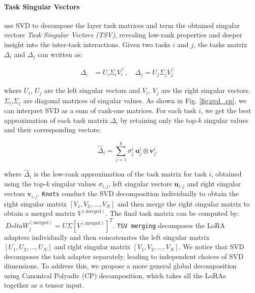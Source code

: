 \documentclass[10pt]{article} %
\begin{document}
    \paragraph{Task Singular Vectors}
    \citep{gargiulo2025task} use SVD to decompose the layer task matrices and
    term the obtained singular vectors \textit{Task Singular Vectors (TSV)},
    revealing low-rank properties and deeper insight into the inter-task
    interactions. Given two tasks $i$ and $j$, the tasks matrix $\Delta_{i}$ and
    $\Delta_{j}$ can written as:

    \begin{align}
        \Delta_{i} & = U_{i}\Sigma_{i}V_{i}^{\top}, \quad \Delta_{j}= U_{j}\Sigma_{j}V_{j}^{\top}
    \end{align}

    where $U_{i}$, $U_{j}$ are the left singular vectors and $V_{i}$, $V_{j}$ are
    the right singular vectors. $\Sigma_{i}$,$\Sigma_{j}$ are diagonal matrices
    of singular values. As shown in Fig. \ref{fig:svd_cp}, we can interpret SVD as
    a sum of rank-one matrices. For each task $i$, we get the best approximation
    of each task matrix $\Delta_{i}$ by retaining only the top-$k$ singular values
    and their corresponding vectors:

    \begin{equation}
        \hat{\Delta}_{i}= \sum_{j=1}^{k}\sigma_{j}^{i}\, \mathbf{u}_{j}^{i}\otimes
        {\mathbf{v}_j^i}.
    \end{equation}
    
    where $\hat{\Delta}_{i}$ is the low-rank approximation of the task matrix
    for task $i$, obtained using the top-$k$ singular values $\sigma_{i,j}$,
    left singular vectors $\mathbf{u}_{i,j}$ and right singular vectors
    $\mathbf{v}_{i,j}$. \texttt{Knots} conduct the SVD decomposition individually to obtain the right singular matrix $[V_1,V_2,...,V_N]$ and then merge the right singular matrix to obtain a merged matrix $V^{(\text{merged})}$. The final task matrix can be computed by: $\ Delta W_{j}^{(\text{merged})} = U\Sigma[V^{(\text{merged})}]^T$. \texttt{TSV merging} decomposes the LoRA adapters individually and then concatenates the left singular matrix $[U_1,U_2,...,U_N]$ and right singular matrix $[V_1,V_2,...,V_N]$. We notice that SVD decomposes the task adapter separately, leading to independent choices of SVD dimensions. To address this, we propose a more general global decomposition 
    using Canonical Polyadic (CP) decomposition, which takes all the LoRAs together as a tensor input. 
\end{document}
